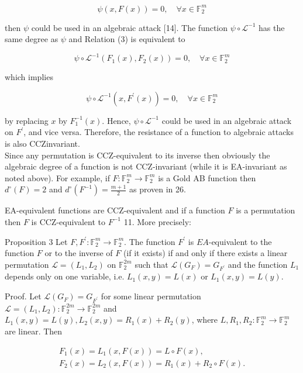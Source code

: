 \documentclass[10pt]{article}
\begin{document}
\begin{equation*}
\psi(x, F(x))=0, \quad \forall x \in \mathbb{F}_{2}^{m} \tag{3}
\end{equation*}


then $\psi$ could be used in an algebraic attack [14]. The function $\psi \circ \mathcal{L}^{-1}$ has the same degree as $\psi$ and Relation (3) is equivalent to

$$
\psi \circ \mathcal{L}^{-1}\left(F_{1}(x), F_{2}(x)\right)=0, \quad \forall x \in \mathbb{F}_{2}^{m}
$$

which implies

$$
\psi \circ \mathcal{L}^{-1}\left(x, F^{\prime}(x)\right)=0, \quad \forall x \in \mathbb{F}_{2}^{m}
$$

by replacing $x$ by $F_{1}^{-1}(x)$. Hence, $\psi \circ \mathcal{L}^{-1}$ could be used in an algebraic attack on $F^{\prime}$, and vice versa. Therefore, the resistance of a function to algebraic attacks is also CCZinvariant.\\
Since any permutation is CCZ-equivalent to its inverse then obviously the algebraic degree of a function is not CCZ-invariant (while it is EA-invariant as noted above). For example, if $F: \mathbb{F}_{2}^{m} \rightarrow \mathbb{F}_{2}^{m}$ is a Gold AB function then $d^{\circ}(F)=2$ and $d^{\circ}\left(F^{-1}\right)=\frac{m+1}{2}$ as proven in 26.

EA-equivalent functions are CCZ-equivalent and if a function $F$ is a permutation then $F$ is CCZ-equivalent to $F^{-1}$ 11. More precisely:

Proposition 3 Let $F, F^{\prime}: \mathbb{F}_{2}^{m} \rightarrow \mathbb{F}_{2}^{m}$. The function $F^{\prime}$ is $E A$-equivalent to the function $F$ or to the inverse of $F$ (if it exists) if and only if there exists a linear permutation $\mathcal{L}=\left(L_{1}, L_{2}\right)$ on $\mathbb{F}_{2}^{2 m}$ such that $\mathcal{L}\left(G_{F}\right)=G_{F^{\prime}}$ and the function $L_{1}$ depends only on one variable, i.e. $L_{1}(x, y)=L(x)$ or $L_{1}(x, y)=L(y)$.

Proof. Let $\mathcal{L}\left(G_{F}\right)=G_{F^{\prime}}$ for some linear permutation $\mathcal{L}=\left(L_{1}, L_{2}\right): \mathbb{F}_{2}^{2 m} \rightarrow \mathbb{F}_{2}^{2 m}$ and $L_{1}(x, y)=L(y), L_{2}(x, y)=R_{1}(x)+R_{2}(y)$, where $L, R_{1}, R_{2}: \mathbb{F}_{2}^{m} \rightarrow \mathbb{F}_{2}^{m}$ are linear. Then

$$
\begin{gathered}
F_{1}(x)=L_{1}(x, F(x))=L \circ F(x), \\
F_{2}(x)=L_{2}(x, F(x))=R_{1}(x)+R_{2} \circ F(x) .
\end{gathered}
$$
\end{document}
